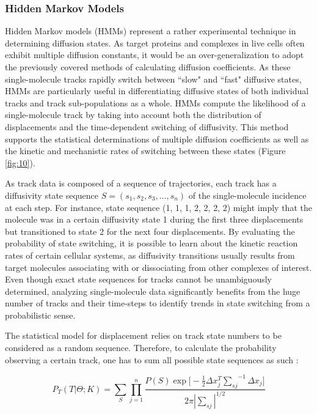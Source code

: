 \documentclass{bioinfo}
\begin{document}
\subsubsection{Hidden Markov Models}

Hidden Markov models (HMMs) represent a rather experimental technique in determining diffusion states. As target proteins and complexes in live cells often exhibit multiple diffusion constants, it would be an over-generalization to adopt the previously covered methods of calculating diffusion coefficients. As these single-molecule tracks rapidly switch between ``slow" and ``fast" diffusive states,  HMMs are particularly useful in differentiating diffusive states of both individual tracks and track sub-populations as a whole. HMMs compute the likelihood of a single-molecule track by taking into account both the distribution of displacements and the time-dependent switching of diffusivity. This method supports the statistical determinations of multiple diffusion coefficients as well as the kinetic and mechanistic rates of switching between these states (Figure \ref{fig:10}). 

As track data is composed of a sequence of trajectories, each track has a diffusivity state sequence $S = (s_1, s_2, s_3,..., s_n)$ of the single-molecule incidence at each step. For instance, state sequence (1, 1, 1, 2, 2, 2, 2) might imply that the molecule was in a certain diffusivity state 1 during the first three displacements but transitioned to state 2 for the next four displacements. By evaluating the probability of state switching, it is possible to learn about the kinetic reaction rates of certain cellular systems, as diffusivity transitions usually results from target molecules associating with or dissociating from other complexes of interest. Even though exact state sequences for tracks cannot be unambiguously determined, analyzing single-molecule data significantly benefits from the huge number of tracks and their time-steps to identify trends in state switching from a probabilistic sense.

The statistical model for displacement relies on track state numbers to be considered as a random sequence. Therefore, to calculate the probability observing a certain track, one has to sum all possible state sequences as such \citep{Yu}:

\begin{equation}
P_T(T|\Theta; K) = \sum_S \prod^n_{j=1} \frac{P(S) \exp{\big[ -\frac{1}{2} \Delta x_j^T {{\sum}_{s j}}^{-1} \Delta x_j \big]}}{2 \pi |{\sum}_{s j}|^{1/2}} \label{eq:12}
\end{equation}
\end{document}
